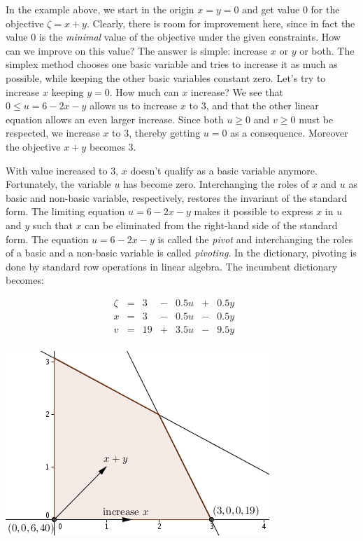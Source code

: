 \documentclass[ukenglish]{nik}
\begin{document}
In the example above, we start in the origin $x=y=0$ and get
value $0$ for the objective $\zeta = x + y$.
Clearly, there is room for improvement here, since in fact
the value $0$ is the \emph{minimal} value of the objective
under the given constraints. How can we improve on this
value? The answer is simple: increase $x$ or $y$ or both.
The simplex method chooses one basic variable and
tries to increase it as much as possible, while keeping the
other basic variables constant zero.
Let's try to increase $x$ keeping $y=0$. How much can $x$ increase?
We see that $0 \leq u = 6 -2x-y$ allows us to increase $x$ to $3$,
and that the other linear equation allows an even larger increase. Since both
$u\geq 0$ and $v\geq 0$ must be respected, we increase $x$ to $3$,
thereby getting $u=0$ as a consequence. Moreover the objective $x+y$ becomes 3.

With value increased to $3$, $x$ doesn't qualify as a basic variable anymore.
Fortunately, the variable $u$ has become zero. Interchanging the roles of
$x$ and $u$ as basic and non-basic variable, respectively, restores 
the invariant of the standard form. The limiting equation $u = 6 -2x-y$ makes it
possible to express $x$ in $u$ and $y$ such that $x$ can be eliminated from the
right-hand side of the standard form. The equation $u = 6 -2x-y$ is
called the \emph{pivot} and interchanging the roles of
a basic and a non-basic variable is called \emph{pivoting}.
In the dictionary, pivoting is done by standard row operations in linear algebra. 
The incumbent dictionary becomes:

	\begin{minipage}{.45\textwidth}
\[    
    \begin{array}{lcrcrcrcr}
      \zeta&=& 3 &-& 0.5 u &+& 0.5 y & &  \\\hline
      x    &=& 3 &-& 0.5 u &-& 0.5 y & &  \\
      v    &=& 19&+& 3.5 u &-& 9.5 y & &  \\

    \end{array}
\]
\end{minipage}
	\begin{minipage}{.45\textwidth}
				\includegraphics{ex2.jpg}
\end{minipage}
\vspace{.2cm}
\end{document}
